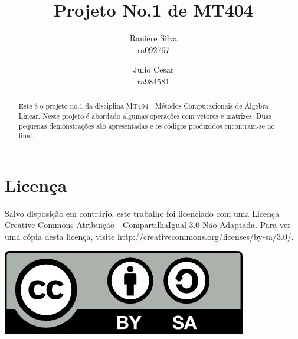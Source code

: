 \documentclass[12pt,a4paper]{article}
\begin{document}
\title{Projeto No.1 de MT404}
\author{Raniere Silva \\ ra092767  \and Julio Cesar \\ ra984581}
\maketitle
\begin{abstract}
    Este \'{e} o projeto no.1 da disciplina MT404 - M\'{e}todos Computacionais de \'{A}lgebra Linear. Neste projeto \'{e} abordado algumas opera\c{c}\~{o}es com vetores e matrizes. Duas pequenas demonstra\c{c}\~{o}es s\~{a}o apresentadas e os c\'{o}digos produzidos encontram-se no final.
\end{abstract}
\tableofcontents
\lstlistoflistings
\section*{Licen\c{c}a}
Salvo disposi\c{c}\~{a}o em contr\'{a}rio, este trabalho foi licenciado com uma Licen\c{c}a Creative Commons Atribui\c{c}\~{a}o - CompartilhaIgual 3.0 N\~{a}o Adaptada. Para ver uma c\'{o}pia desta licen\c{c}a, visite http://creativecommons.org/licenses/by-sa/3.0/.
\begin{center}
    \includegraphics{../figuras/cc-by-sa.png}
\end{center}
\newpage
\end{document}
